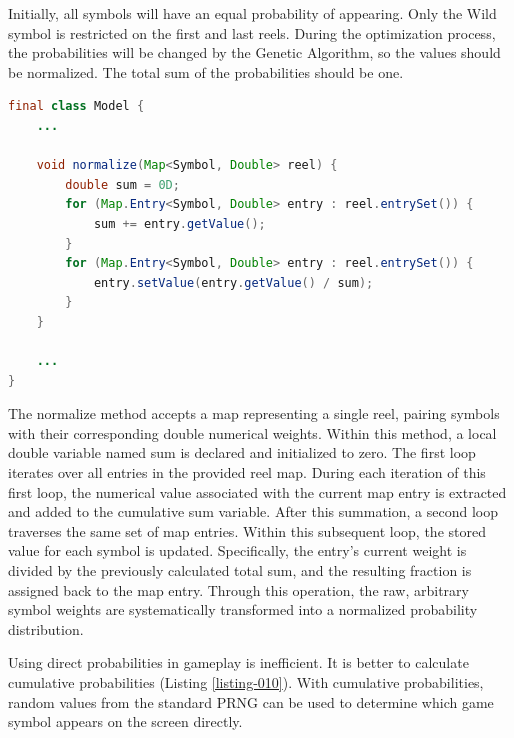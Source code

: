 \documentclass[12pt,twoside,openany]{book}
\begin{document}
Initially, all symbols will have an equal probability of appearing. Only the Wild symbol is restricted on the first and last reels. During the optimization process, the probabilities will be changed by the Genetic Algorithm, so the values should be normalized. The total sum of the probabilities should be one.

\begin{lstlisting}[language=Java, caption={Probabilities normalization}, label=listing-009]
final class Model {
	...

	void normalize(Map<Symbol, Double> reel) {
		double sum = 0D;
		for (Map.Entry<Symbol, Double> entry : reel.entrySet()) {
			sum += entry.getValue();
		}
		for (Map.Entry<Symbol, Double> entry : reel.entrySet()) {
			entry.setValue(entry.getValue() / sum);
		}
	}

	...
}
\end{lstlisting}

The normalize method accepts a map representing a single reel, pairing symbols with their corresponding double numerical weights. Within this method, a local double variable named sum is declared and initialized to zero. The first loop iterates over all entries in the provided reel map. During each iteration of this first loop, the numerical value associated with the current map entry is extracted and added to the cumulative sum variable. After this summation, a second loop traverses the same set of map entries. Within this subsequent loop, the stored value for each symbol is updated. Specifically, the entry's current weight is divided by the previously calculated total sum, and the resulting fraction is assigned back to the map entry. Through this operation, the raw, arbitrary symbol weights are systematically transformed into a normalized probability distribution.

Using direct probabilities in gameplay is inefficient. It is better to calculate cumulative probabilities (Listing \ref{listing-010}). With cumulative probabilities, random values from the standard PRNG can be used to determine which game symbol appears on the screen directly.
\end{document}
